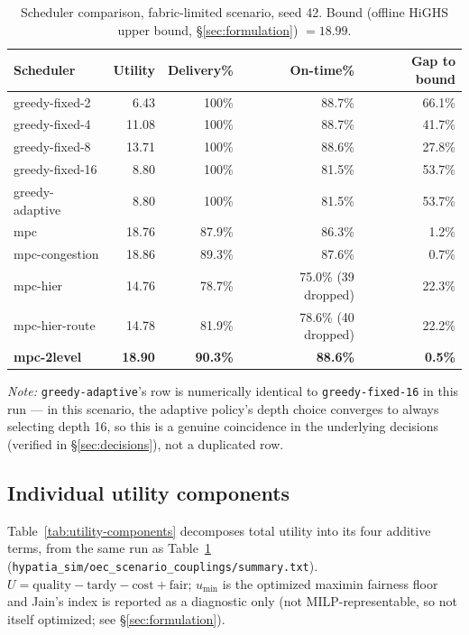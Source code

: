 \begin{table}[h]
\centering
\caption{Scheduler comparison, fabric-limited scenario, seed 42. Bound
(offline HiGHS upper bound, \S\ref{sec:formulation}) $= 18.99$.}
\label{tab:scheduler-comparison}
\begin{tabular}{lrrrr}
\toprule
Scheduler & Utility & Delivery\% & On-time\% & Gap to bound \\
\midrule
greedy-fixed-2   & 6.43  & 100\% & 88.7\% & 66.1\% \\
greedy-fixed-4   & 11.08 & 100\% & 88.7\% & 41.7\% \\
greedy-fixed-8   & 13.71 & 100\% & 88.6\% & 27.8\% \\
greedy-fixed-16  & 8.80  & 100\% & 81.5\% & 53.7\% \\
greedy-adaptive  & 8.80  & 100\% & 81.5\% & 53.7\% \\
mpc              & 18.76 & 87.9\% & 86.3\% & 1.2\% \\
mpc-congestion   & 18.86 & 89.3\% & 87.6\% & 0.7\% \\
mpc-hier         & 14.76 & 78.7\% & 75.0\% (39 dropped) & 22.3\% \\
mpc-hier-route   & 14.78 & 81.9\% & 78.6\% (40 dropped) & 22.2\% \\
\textbf{mpc-2level} & \textbf{18.90} & \textbf{90.3\%} & \textbf{88.6\%} & \textbf{0.5\%} \\
\bottomrule
\end{tabular}
\end{table}

\emph{Note:} \texttt{greedy-adaptive}'s row is numerically identical to
\texttt{greedy-fixed-16} in this run — in this scenario, the adaptive
policy's depth choice converges to always selecting depth 16, so this is a
genuine coincidence in the underlying decisions (verified in
\S\ref{sec:decisions}), not a duplicated row.

\subsection{Individual utility components}

Table~\ref{tab:utility-components} decomposes total utility into its four
additive terms, from the same run as Table~\ref{tab:scheduler-comparison}
(\texttt{hypatia\_sim/oec\_scenario\_couplings/summary.txt}).
$U = \text{quality} - \text{tardy} - \text{cost} + \text{fair}$; $u_{\min}$
is the optimized maximin fairness floor and Jain's index is reported as a
diagnostic only (not MILP-representable, so not itself optimized; see
\S\ref{sec:formulation}).

